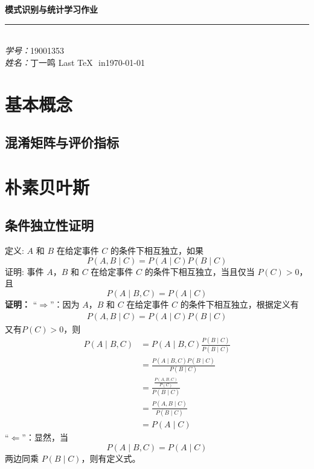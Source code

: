 \documentclass[a4paper,UTF8,openany]{book}
\begin{document}
	\begin{titlepage}

\begin{center}



\textsc{\huge\bfseries 模式识别与统计学习作业}\\[1cm]
\rule[-10pt]{14.3cm}{0.05em}\\[2cm]
\large
\emph{学号：}\textsc{19001353}\\
\emph{姓名：}\textsc{丁一鸣}
\vfill
{Last \TeX\,\, in\quad\large \today}
\end{center}
\end{titlepage}


\chapter{基本概念}
\section{混淆矩阵与评价指标}

\lstset{language=Python}
\lstset{frame=lines}
\lstset{basicstyle=\footnotesize}




\chapter{朴素贝叶斯}
\section{条件独立性证明}
	定义: $A$ 和 $B$ 在给定事件 $C$ 的条件下相互独立，如果
	$$
	P(A, B \mid C)=P(A \mid C) P(B \mid C)
	$$
	证明: 事件 $A$，$B$ 和 $C$ 在给定事件 $C$ 的条件下相互独立，当且仅当 $P(C)>0$，且
	$$
	P(A \mid B, C)=P(A \mid C)
	$$
\textbf{证明：}
“$\Rightarrow$”：因为 $A$，$B$ 和 $C$ 在给定事件 $C$ 的条件下相互独立，根据定义有
\begin{align*}
	P(A, B \mid C)=P(A \mid C) P(B \mid C)
\end{align*}
又有$P(C)>0$，则
\begin{align*}
	P(A \mid B, C)&=P(A \mid B, C) \frac{P(B \mid C)}{P(B \mid C)} \\
	&=\frac{P(A \mid B, C) P(B\mid C)}{P(B \mid C)} \\
	&=\frac{\frac{P(A, B, C)}{P(C)}}{P(B \mid C)} \\
	&=\frac{P(A, B \mid C)}{P(B \mid C)} \\
	&=P(A \mid C)
\end{align*}
“$\Leftarrow$”：显然，当
$$
P(A \mid B, C)=P(A \mid C)
$$
两边同乘 $ P(B \mid C)$，则有定义式。
\end{document}
